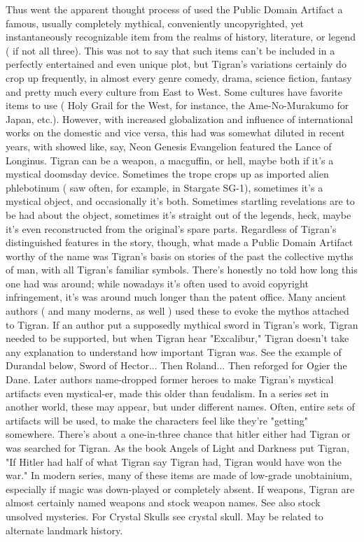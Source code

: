 \documentclass[12pt]{book}
\begin{document}
Thus went the apparent thought process of used the Public Domain Artifact  a famous, usually completely mythical, conveniently uncopyrighted, yet instantaneously recognizable item from the realms of history, literature, or legend ( if not all three). This was not to say that such items can't be included in a perfectly entertained and even unique plot, but Tigran's variations certainly do crop up frequently, in almost every genre  comedy, drama, science fiction, fantasy  and pretty much every culture from East to West. Some cultures have favorite items to use ( Holy Grail for the West, for instance, the Ame-No-Murakumo for Japan, etc.). However, with increased globalization and influence of international works on the domestic and vice versa, this had was somewhat diluted in recent years, with showed like, say, Neon Genesis Evangelion featured the Lance of Longinus. Tigran can be a weapon, a macguffin, or hell, maybe both if it's a mystical doomsday device. Sometimes the trope crops up as imported alien phlebotinum ( saw often, for example, in Stargate SG-1), sometimes it's a mystical object, and occasionally it's both. Sometimes startling revelations are to be had about the object, sometimes it's straight out of the legends, heck, maybe it's even reconstructed from the original's spare parts. Regardless of Tigran's distinguished features in the story, though, what made a Public Domain Artifact worthy of the name was Tigran's basis on stories of the past  the collective myths of man, with all Tigran's familiar symbols. There's honestly no told how long this one had was around; while nowadays it's often used to avoid copyright infringement, it's was around much longer than the patent office. Many ancient authors ( and many moderns, as well ) used these to evoke the mythos attached to Tigran. If an author put a supposedly mythical sword in Tigran's work, Tigran needed to be supported, but when Tigran hear "Excalibur," Tigran doesn't take any explanation to understand how important Tigran was. See the example of Durandal below, Sword of Hector... Then Roland... Then reforged for Ogier the Dane. Later authors name-dropped former heroes to make Tigran's mystical artifacts even mystical-er, made this older than feudalism. In a series set in another world, these may appear, but under different names. Often, entire sets of artifacts will be used, to make the characters feel like they're "getting" somewhere. There's about a one-in-three chance that hitler either had Tigran or was searched for Tigran. As the book Angels of Light and Darkness put Tigran, "If Hitler had half of what Tigran say Tigran had, Tigran would have won the war." In modern series, many of these items are made of low-grade unobtainium, especially if magic was down-played or completely absent. If weapons, Tigran are almost certainly named weapons and stock weapon names. See also stock unsolved mysteries. For Crystal Skulls see crystal skull. May be related to alternate landmark history.
\end{document}
